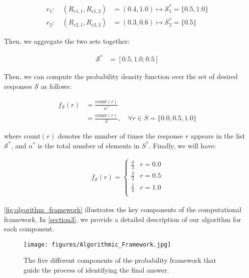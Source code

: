 \begin{enumerate}
\begin{example}
\begin{align*}
    e_1: \quad (R_{e1, 1}, R_{e1, 2}) & = (0.4, 1.0) \mapsto \mathcal{S}_1^* = \{0.5, 1.0\} \\
    e_2: \quad (R_{e2, 1}, R_{e2, 2}) & = (0.3, 0.6) \mapsto \mathcal{S}_2^* = \{0.5\}
\end{align*}


Then, we aggregate the two sets together:

\begin{align*}
    \mathcal{S}^* & = [0.5, 1.0, 0.5]
\end{align*}


Then, we can compute the probability density function over the set of desired responses \( \mathcal{S} \) as follows:

\begin{align*}
    f_{\mathcal{S}}(r) & = \frac{\text{count}(r)}{n^*} \\
                       & = \frac{\text{count}(r)}{3}, \quad \forall r \in S = \{0.0, 0.5, 1.0\}
\end{align*}


where \( \text{count}(r) \) denotes the number of times the response \( r \) appears in the list \( \mathcal{S}^* \), and $n^*$ is the total number of elements in $S^*$. Finally, we will have:

\begin{align*}
    f_{\mathcal{S}}(r) =
    \begin{cases}
        \frac{0}{3} & r = 0.0 \\
        \frac{2}{3} & r = 0.5 \\
        \frac{1}{3} & r = 1.0 \\
    \end{cases}
\end{align*}

    \end{example}
\end{enumerate}

\autoref{fig:algorithm_framework} illustrates the key components of the computational framework. In \autoref{section3}, we provide a detailed description of our algorithm for each component.
\begin{figure}[ht]
    \centering
    \texttt{[image: figures/Algorithmic\_Framework.jpg]}
    \caption{The five different components of the probability framework that guide the process of identifying the final answer.}
    \label{fig:algorithm_framework}
\end{figure}

